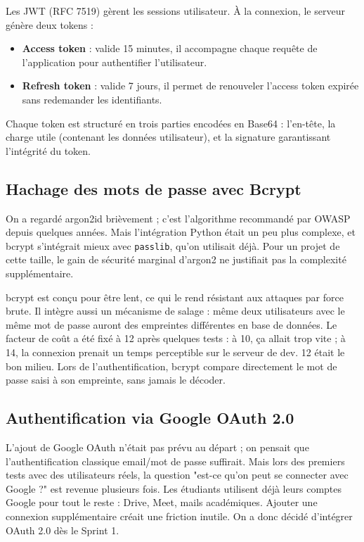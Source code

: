 Les JWT \cite{jwt} (RFC 7519) gèrent les sessions utilisateur. À la connexion, le serveur génère deux tokens :
\begin{itemize}
    \item \textbf{Access token} : valide 15 minutes, il accompagne chaque requête de l'application pour authentifier l'utilisateur.
    \item \textbf{Refresh token} : valide 7 jours, il permet de renouveler l'access token expirée sans redemander les identifiants.
\end{itemize}

Chaque token est structuré en trois parties encodées en Base64 : l'en-tête, la charge utile (contenant les données utilisateur), et la signature garantissant l'intégrité du token.

\subsection{Hachage des mots de passe avec Bcrypt}

On a regardé argon2id brièvement ; c'est l'algorithme recommandé par OWASP depuis quelques années. Mais l'intégration Python était un peu plus complexe, et bcrypt \cite{bcrypt} s'intégrait mieux avec \texttt{passlib}, qu'on utilisait déjà. Pour un projet de cette taille, le gain de sécurité marginal d'argon2 ne justifiait pas la complexité supplémentaire.

bcrypt est conçu pour être lent, ce qui le rend résistant aux attaques par force brute. Il intègre aussi un mécanisme de salage : même deux utilisateurs avec le même mot de passe auront des empreintes différentes en base de données. Le facteur de coût a été fixé à 12 après quelques tests : à 10, ça allait trop vite ; à 14, la connexion prenait un temps perceptible sur le serveur de dev. 12 était le bon milieu. Lors de l'authentification, bcrypt compare directement le mot de passe saisi à son empreinte, sans jamais le décoder.

\subsection{Authentification via Google OAuth 2.0}

L'ajout de Google OAuth n'était pas prévu au départ ; on pensait que l'authentification classique email/mot de passe suffirait. Mais lors des premiers tests avec des utilisateurs réels, la question "est-ce qu'on peut se connecter avec Google ?" est revenue plusieurs fois. Les étudiants utilisent déjà leurs comptes Google pour tout le reste : Drive, Meet, mails académiques. Ajouter une connexion supplémentaire créait une friction inutile. On a donc décidé d'intégrer OAuth 2.0 dès le Sprint 1.

